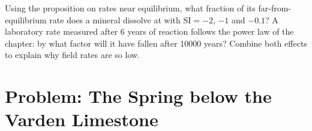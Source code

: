 \begin{exercise}[$\star\star\star$]\label{exo:b3:water-rock-interaction:12}
Using the proposition on rates near equilibrium, what fraction of its
far-from-equilibrium rate does a mineral dissolve at with $\mathrm{SI} =
-2$, $-1$ and $-0.1$? A laboratory rate measured after 6 years of reaction
follows the power law of the chapter: by what factor will it have fallen
after \num{10000} years? Combine both effects to explain why field rates are
so low.
\end{exercise}

\section{Problem: The Spring below the Varden Limestone}

